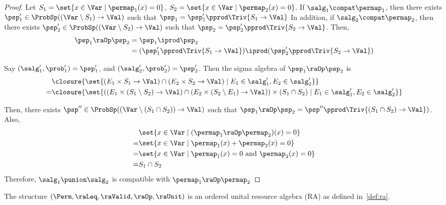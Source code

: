\begin{proof}
  Let $S_1 = \set{x \in \Var \mid \permap_1(x) = 0}$,
  $S_2 = \set{x \in \Var \mid \permap_2(x) = 0}$.
  If $\salg_1\compat\permap_1$, then there exists
  $\psp_1' \in \ProbSp((\Var \setminus S_1) \to \Val)$
  such that
  $\psp_1 = \psp_1' \pprod \Triv{S_1 \to \Val}$
  In addition, if $\salg_2\compat\permap_2$, then there exists
  $\psp_2' \in \ProbSp((\Var \setminus S_2) \to \Val)$
  such that
  $\psp_2 = \psp_2' \pprod \Triv{S_2 \to \Val}$.
  Then,
  \begin{align*}
    \psp_1 \raOp \psp_2
    &= \psp_1 \iprod \psp_2 \\
    &= (\psp_1' \pprod \Triv{S_1 \to \Val}) \iprod
    (\psp_2' \pprod \Triv{S_2 \to \Val})
  \end{align*}

  Say $(\salg_1', \prob_1') = \psp_1'$,
  and  $(\salg_2', \prob_2') = \psp_2'$.
  Then the sigma algebra of $\psp_1 \raOp \psp_2$
  is
  \begin{align*}
  &\closure{\set{(E_1 \times S_1 \to \Val) \cap (E_2 \times S_2 \to \Val) \mid E_1 \in \salg_1', E_2 \in \salg_2'}} \\
    = & \closure{\set{\left( (E_1 \times (S_1 \setminus S_2) \to \Val) \cap (E_2 \times (S_2 \setminus E_1) \to \Val) \right) \times (S_1 \cap S_2) \mid E_1 \in \salg_1', E_2 \in \salg_2'}}
  \end{align*}

  Then, there exists $\psp'' \in \ProbSp((\Var \setminus (S_1 \cap S_2)) \to \Val)$ such that
  $\psp_1 \raOp \psp_2 = \psp'' \pprod  \Triv{(S_1 \cap S_2) \to \Val})$.
  Also,
  \begin{align*}
     &\set{x \in \Var \mid (\permap_1 \raOp \permap_2)(x) = 0} \\
    =&\set{x \in \Var \mid \permap_1(x) + \permap_2(x) = 0} \\
    =&\set{x \in \Var \mid \permap_1(x) = 0 \text{ and } \permap_2(x) = 0} \\
    =& S_1 \cap S_2
  \end{align*}
  Therefore, $\salg_1 \punion \salg_2$ is compatible with $\permap_1 \raOp \permap_2$
\end{proof}

\begin{lemma}
  The structure $(\Perm, \raLeq, \raValid, \raOp, \raUnit)$ is an ordered unital resource algebra (RA) as defined
  in~\cref{def:ra}.
\end{lemma}

